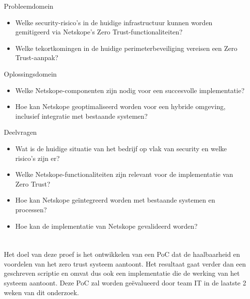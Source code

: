 Probleemdomein
\begin{itemize}
  \item Welke security-risico’s in de huidige infrastructuur kunnen worden gemitigeerd via Netskope’s Zero Trust-functionaliteiten?
  \item Welke tekortkomingen in de huidige perimeterbeveiliging vereisen een Zero Trust-aanpak?
\end{itemize}

Oplossingsdomein
\begin{itemize}
  \item Welke Netskope-componenten zijn nodig voor een succesvolle implementatie?
  \item Hoe kan Netskope geoptimaliseerd worden voor een hybride omgeving, inclusief integratie met bestaande systemen?
\end{itemize}

Deelvragen
\begin{itemize}
  \item Wat is de huidige situatie van het bedrijf op vlak van security en welke risico’s zijn er?
  \item Welke Netskope-functionaliteiten zijn relevant voor de implementatie van Zero Trust?
  \item Hoe kan Netskope geïntegreerd worden met bestaande systemen en processen?
  \item Hoe kan de implementatie van Netskope gevalideerd worden?
\end{itemize}

\section{}%
\label{sec:onderzoeksdoelstelling}


Het doel van deze proef is het ontwikkelen van een PoC dat de haalbaarheid en
voordelen van het zero trust systeem aantoont.
Het resultaat gaat verder dan een geschreven scriptie en omvat dus ook een implementatie die de werking van het systeem aantoont. 
Deze PoC zal worden geëvalueerd door team IT in de laatste 2 weken van dit onderzoek.

\section{}%
\label{sec:opzet-bachelorproef}

